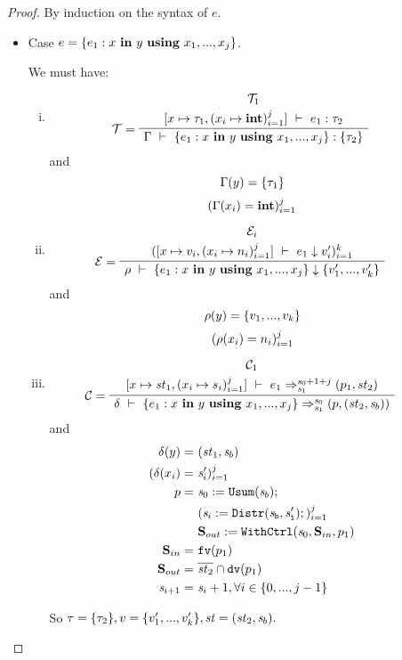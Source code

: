 \begin{proof}
	By induction on the syntax of $e$.
	
	\begin{itemize}
		\item Case $e = \{e_1 : x \ \mathbf{in} \ y \ \mathbf{using} \ x_1,...,x_j\}$. \\
\def\eqnum#1{eq-mainproof-#1}  

\def\kunit{\vrange{()_1}{()_k}} 
\def\stwo{\< \F_1,..., \F_k, \T \'>}
\def\sgmszs{\sgm[\s_0 \|-> \kunit, \st_2 \>-> \sgm''(\st_2)]}
\def\sgmsz{\sgm[\s_0 \|-> \kunit]}

		We must have: 
		\begin{enumerate}[(i)]
		\item 
		$$\PT{
			\UCN{\MT_1}{\Type{[x \|-> {\tau_1}, \j{x_i \|-> \int}]}{e_1}{\tau_2}}
			\LeLa{\MT = }
			\UC{\Type{\Gam}{\Comp{e_1}{x}{y}{\usevars}}{\tseq{\tau_2}}}
		} $$
	    and $$\Gamma(y)=\{\tau_1\}$$
	        $$(\Gamma(x_i) = \mathbf{int})^j_{i=1}$$
		
		\item
		\[\PT{
			\UCN{\ME_i}{\k{\Eval{[x \|-> {v_i}, \j{x_i \|-> n_i}]}{e_1}{v_i'}}}
			\LeLa{\ME = }
			\UC{\Eval{\rho}{\Comp{e_1}{x}{y}{\usevars}}{\Seqk{v'}}}
		}\]
	    and $$\rho(y)=\{ v_1,...,v_k \} $$
	    \[(\rho(x_i) = n_i)^j_{i=1}\]
		
		\item 
		\[\PT{
			\UCN{\MC_1}{\Trans{[x \|-> {\st_1}, \j{x_i \|-> s_i}]}{e_1}{\s_0+1+j}{\s_1}{\sfun{p_1}{\st_2}}}
			\LeLa{\MC = }
			\UC{\Trans{\del}{\Comp{e_1}{x}{y}{\usevars}}{\s_0}{\s_1}
				{\sfun{p}{(\st_2,\s_b)}}}
		}\]
	    and
	    	\begin{align*}
	    		\delta(y) = &  \ (\mathit{st}_1,\mathit{s}_b) \\
	    		(\delta(x_i) = & \ \mathit{s}_i')^j_{i=1} \\
	    		p = & \ \mathit{s}_0 := \mathtt{Usum}(\mathit{s}_b); \\
	    		& \ (\mathit{s}_i := \mathtt{Distr(\mathit{s}_b,\mathit{s}_i')};)^j_{i=1} \\
	    		& \ \mathbf{S}_{out} := \mathtt{WithCtrl}(\mathit{s}_0,\mathbf{S}_{in},p_1) \\
	    		\mathbf{S}_{in} = &  \ \mathtt{fv}(p_1) \\
	    		\mathbf{S}_{out} = & \ \overline{\mathit{st}_2} \cap \mathtt{dv}(p_1) \\
	    		\mathit{s}_{i+1} = & \ \mathit{s}_i + 1, \forall i \in \{0,...,j-1\} \\
	    	\end{align*}


	
	 So $\tau = \{\tau_2\}, v = \{ v'_1,...,v'_k \}, \mathit{st} = (\mathit{st}_2,\mathit{s}_b). $ \\


\end{enumerate}
\end{itemize}
\end{proof}
